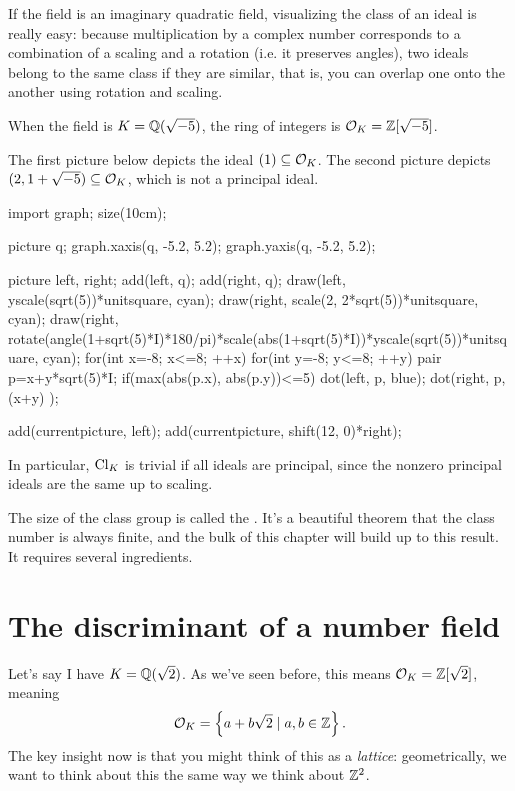 \begin{example}
	If the field is an imaginary quadratic field, visualizing the class of an ideal is really easy:
	because multiplication by a complex number corresponds to a combination of a scaling and a
	rotation (i.e. it preserves angles), two ideals belong to the same class if they are similar,
	that is, you can overlap one onto the another using rotation and scaling.

	When the field is $K = \mathbb Q(\sqrt{-5})$, the ring of integers is $\mathcal O_K = \mathbb Z[\sqrt{-5}]$.

	The first picture below depicts the ideal $(1) \subseteq \mathcal O_K$. The second picture depicts $(2,
	1+\sqrt{-5}) \subseteq \mathcal O_K$, which is not a principal ideal.
	\begin{center}
		\begin{asy}
			import graph;
			size(10cm);

			picture q;
			graph.xaxis(q, -5.2, 5.2);
			graph.yaxis(q, -5.2, 5.2);

			picture left, right;
			add(left, q); add(right, q);
			draw(left, yscale(sqrt(5))*unitsquare, cyan);
			draw(right, scale(2, 2*sqrt(5))*unitsquare, cyan);
			draw(right, rotate(angle(1+sqrt(5)*I)*180/pi)*scale(abs(1+sqrt(5)*I))*yscale(sqrt(5))*unitsquare, cyan);
			for(int x=-8; x<=8; ++x){
				for(int y=-8; y<=8; ++y){
					pair p=x+y*sqrt(5)*I;
					if(max(abs(p.x), abs(p.y))<=5){
						dot(left, p, blue);
						dot(right, p, (x+y)%
							);
					}
				}
			}

			add(currentpicture, left);
			add(currentpicture, shift(12, 0)*right);
		\end{asy}
	\end{center}
\end{example}

In particular, $\mathrm{Cl}_K$ is trivial if all ideals are principal,
since the nonzero principal ideals are the same up to scaling.

The size of the class group is called the .
It's a beautiful theorem that the class number is always finite,
and the bulk of this chapter will build up to this result.
It requires several ingredients.


\section{The discriminant of a number field}
Let's say I have $K = \mathbb Q(\sqrt 2)$.
As we've seen before, this means $\mathcal O_K = \mathbb Z[\sqrt 2]$, meaning
\[ \mathcal O_K = \left\{ a + b \sqrt 2 \mid a,b \in \mathbb Z \right\}. \]
The key insight now is that you might think of this as a \emph{lattice}:
geometrically, we want to think about this the same way we think about $\mathbb Z^2$.

